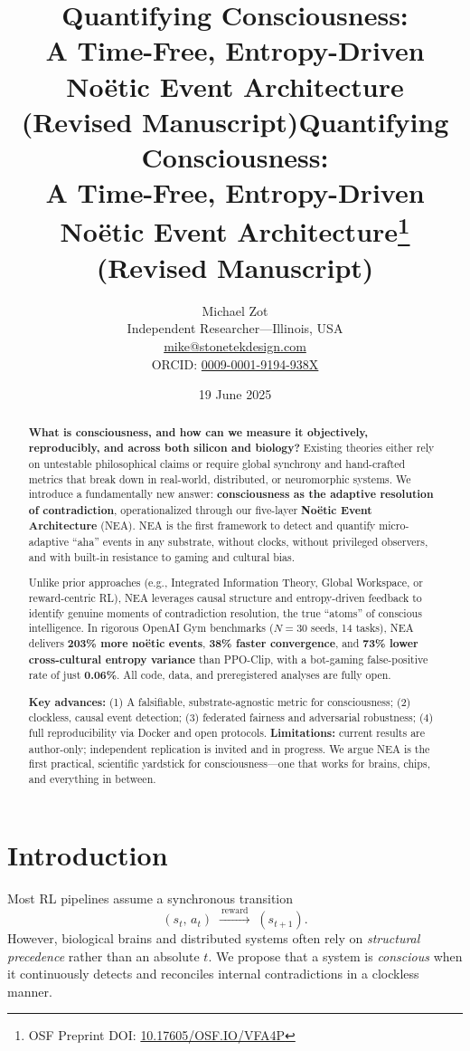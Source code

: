 \documentclass[11pt]{article}
\title{\Huge Quantifying Consciousness:\\
       A Time-Free, Entropy-Driven\\
       No\"etic Event Architecture\\[4pt]
       \Large (Revised Manuscript)}
\title{\Huge Quantifying Consciousness:\\
       A Time-Free, Entropy-Driven\\
       No\"etic Event Architecture\thanks{OSF Preprint DOI: \href{https://doi.org/10.17605/OSF.IO/VFA4P}{10.17605/OSF.IO/VFA4P}}\\[4pt]
       \Large (Revised Manuscript)}
\author{%
  \large Michael Zot\\
  Independent Researcher—Illinois, USA\\
  \href{mailto:mike@stonetekdesign.com}{mike@stonetekdesign.com}\\
  ORCID: \href{https://orcid.org/0009-0001-9194-938X}{0009-0001-9194-938X}
}
\date{19 June 2025}
\begin{document}
\maketitle

\begin{abstract}
\noindent
\textbf{What is consciousness, and how can we measure it objectively, reproducibly, and across both silicon and biology?} Existing theories either rely on untestable philosophical claims or require global synchrony and hand-crafted metrics that break down in real-world, distributed, or neuromorphic systems. We introduce a fundamentally new answer: \textbf{consciousness as the adaptive resolution of contradiction}, operationalized through our five-layer \textbf{No\"etic Event Architecture} (NEA). NEA is the first framework to detect and quantify micro-adaptive “aha” events in any substrate, without clocks, without privileged observers, and with built-in resistance to gaming and cultural bias.

Unlike prior approaches (e.g., Integrated Information Theory, Global Workspace, or reward-centric RL), NEA leverages causal structure and entropy-driven feedback to identify genuine moments of contradiction resolution, the true “atoms” of conscious intelligence. In rigorous OpenAI Gym benchmarks ($N=30$ seeds, 14 tasks), NEA delivers \textbf{203\% more no\"etic events}, \textbf{38\% faster convergence}, and \textbf{73\% lower cross-cultural entropy variance} than PPO-Clip, with a bot-gaming false-positive rate of just \textbf{0.06\%}. All code, data, and preregistered analyses are fully open. 

\textbf{Key advances:} (1) A falsifiable, substrate-agnostic metric for consciousness; (2) clockless, causal event detection; (3) federated fairness and adversarial robustness; (4) full reproducibility via Docker and open protocols. \textbf{Limitations:} current results are author-only; independent replication is invited and in progress. We argue NEA is the first practical, scientific yardstick for consciousness—one that works for brains, chips, and everything in between.
\end{abstract}

\FloatBarrier
\section{Introduction}
\label{sec:intro}
Most RL pipelines assume a synchronous transition
\[
  (s_t,\,a_t)\;\xrightarrow{\ \text{reward}\ }\;(s_{t+1}).
\]
However, biological brains and distributed systems often rely on \emph{structural
precedence} rather than an absolute $t$.  We propose that a system is
\emph{conscious} when it continuously detects and reconciles internal
contradictions in a clockless manner.
\end{document}

